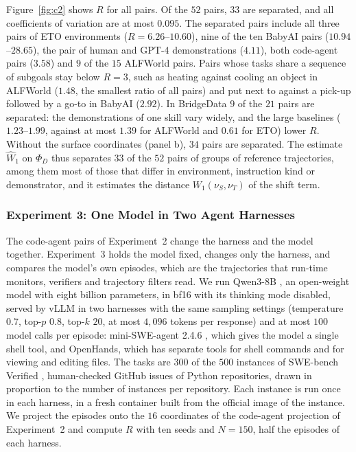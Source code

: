 Figure~\ref{fig:c2} shows $R$ for all pairs. Of the $52$ pairs, $33$ are separated, and all coefficients of variation are at most $0.095$. The separated pairs include all three pairs of ETO environments ($R=6.26$--$10.60$), nine of the ten BabyAI pairs ($10.94$--$28.65$), the pair of human and GPT-4 demonstrations ($4.11$), both code-agent pairs ($3.58$) and $9$ of the $15$ ALFWorld pairs. Pairs whose tasks share a sequence of subgoals stay below $R=3$, such as heating against cooling an object in ALFWorld ($1.48$, the smallest ratio of all pairs) and put next to against a pick-up followed by a go-to in BabyAI ($2.92$). In BridgeData $9$ of the $21$ pairs are separated: the demonstrations of one skill vary widely, and the large baselines ($1.23$--$1.99$, against at most $1.39$ for ALFWorld and $0.61$ for ETO) lower $R$. Without the surface coordinates (panel b), $34$ pairs are separated. The estimate $\widehat W_1$ on $\Phi_D$ thus separates $33$ of the $52$ pairs of groups of reference trajectories, among them most of those that differ in environment, instruction kind or demonstrator, and it estimates the distance $W_1(\nu_S,\nu_T)$ of the shift term.

\subsubsection{Experiment 3: One Model in Two Agent Harnesses}
\label{app:c2-harness}

The code-agent pairs of Experiment~2 change the harness and the model together. Experiment~3 holds the model fixed, changes only the harness, and compares the model's own episodes, which are the trajectories that run-time monitors, verifiers and trajectory filters read. We run Qwen3-8B \citep{qwen2025qwen3}, an open-weight model with eight billion parameters, in bf16 with its thinking mode disabled, served by vLLM \citep{kwon2023vllm} in two harnesses with the same sampling settings (temperature $0.7$, top-$p$ $0.8$, top-$k$ $20$, at most $4{,}096$ tokens per response) and at most $100$ model calls per episode: mini-SWE-agent 2.4.6 \citep{yang2024sweagent}, which gives the model a single shell tool, and OpenHands, which has separate tools for shell commands and for viewing and editing files. The tasks are $300$ of the $500$ instances of SWE-bench Verified \citep{jimenez2024swebench,openai2024swebenchverified}, human-checked GitHub issues of Python repositories, drawn in proportion to the number of instances per repository. Each instance is run once in each harness, in a fresh container built from the official image of the instance. We project the episodes onto the $16$ coordinates of the code-agent projection of Experiment~2 and compute $R$ with ten seeds and $N=150$, half the episodes of each harness.

